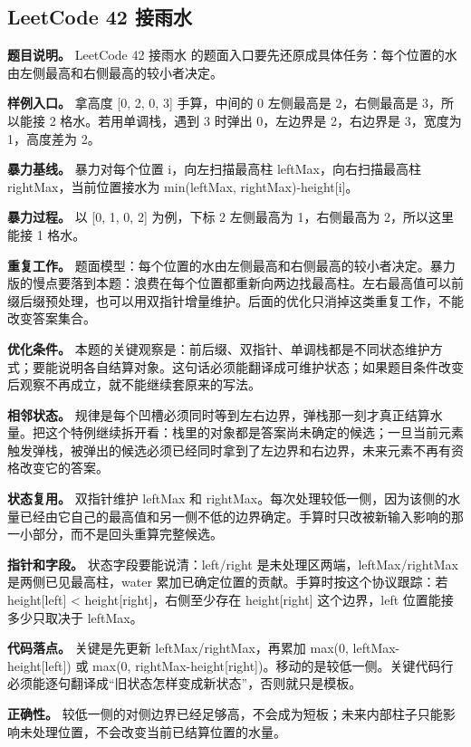 \subsection{LeetCode 42 接雨水}

\textbf{题目说明。} LeetCode 42 接雨水 的题面入口要先还原成具体任务：每个位置的水由左侧最高和右侧最高的较小者决定。

\textbf{样例入口。} 拿高度 [0, 2, 0, 3] 手算，中间的 0 左侧最高是 2，右侧最高是 3，所以能接 2 格水。若用单调栈，遇到 3 时弹出 0，左边界是 2，右边界是 3，宽度为 1，高度差为 2。

\textbf{暴力基线。} 暴力对每个位置 i，向左扫描最高柱 leftMax，向右扫描最高柱 rightMax，当前位置接水为 min(leftMax, rightMax)-height[i]。

\textbf{暴力过程。} 以 [0, 1, 0, 2] 为例，下标 2 左侧最高为 1，右侧最高为 2，所以这里能接 1 格水。

\textbf{重复工作。} 题面模型：每个位置的水由左侧最高和右侧最高的较小者决定。暴力版的慢点要落到本题：浪费在每个位置都重新向两边找最高柱。左右最高值可以前缀后缀预处理，也可以用双指针增量维护。后面的优化只消掉这类重复工作，不能改变答案集合。

\textbf{优化条件。} 本题的关键观察是：前后缀、双指针、单调栈都是不同状态维护方式；要能说明各自结算对象。这句话必须能翻译成可维护状态；如果题目条件改变后观察不再成立，就不能继续套原来的写法。

\textbf{相邻状态。} 规律是每个凹槽必须同时等到左右边界，弹栈那一刻才真正结算水量。把这个特例继续拆开看：栈里的对象都是答案尚未确定的候选；一旦当前元素触发弹栈，被弹出的候选必须已经同时拿到了左边界和右边界，未来元素不再有资格改变它的答案。

\textbf{状态复用。} 双指针维护 leftMax 和 rightMax。每次处理较低一侧，因为该侧的水量已经由它自己的最高值和另一侧不低的边界确定。手算时只改被新输入影响的那一小部分，而不是回头重算完整候选。

\textbf{指针和字段。} 状态字段要能说清：left/right 是未处理区两端，leftMax/rightMax 是两侧已见最高柱，water 累加已确定位置的贡献。手算时按这个协议跟踪：若 height[left] < height[right]，右侧至少存在 height[right] 这个边界，left 位置能接多少只取决于 leftMax。

\textbf{代码落点。} 关键是先更新 leftMax/rightMax，再累加 max(0, leftMax-height[left]) 或 max(0, rightMax-height[right])。移动的是较低一侧。关键代码行必须能逐句翻译成“旧状态怎样变成新状态”，否则就只是模板。

\textbf{正确性。} 较低一侧的对侧边界已经足够高，不会成为短板；未来内部柱子只能影响未处理位置，不会改变当前已结算位置的水量。

